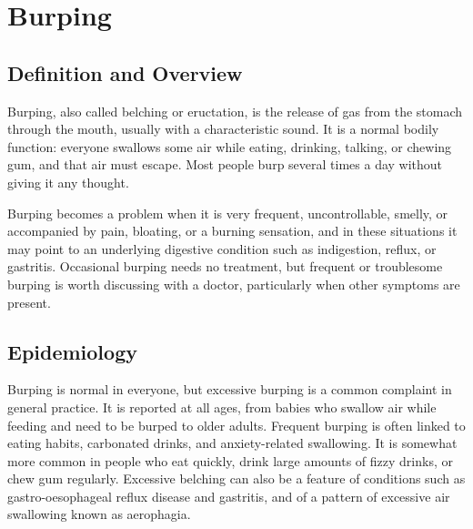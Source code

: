 \chapter{Burping}

\section*{Definition and Overview}
Burping, also called belching or eructation, is the release of gas from the stomach through the mouth, usually with a characteristic sound. It is a normal bodily function: everyone swallows some air while eating, drinking, talking, or chewing gum, and that air must escape. Most people burp several times a day without giving it any thought.

Burping becomes a problem when it is very frequent, uncontrollable, smelly, or accompanied by pain, bloating, or a burning sensation, and in these situations it may point to an underlying digestive condition such as indigestion, reflux, or gastritis. Occasional burping needs no treatment, but frequent or troublesome burping is worth discussing with a doctor, particularly when other symptoms are present.

\section*{Epidemiology}
Burping is normal in everyone, but excessive burping is a common complaint in general practice. It is reported at all ages, from babies who swallow air while feeding and need to be burped to older adults. Frequent burping is often linked to eating habits, carbonated drinks, and anxiety-related swallowing. It is somewhat more common in people who eat quickly, drink large amounts of fizzy drinks, or chew gum regularly. Excessive belching can also be a feature of conditions such as gastro-oesophageal reflux disease and gastritis, and of a pattern of excessive air swallowing known as aerophagia.

